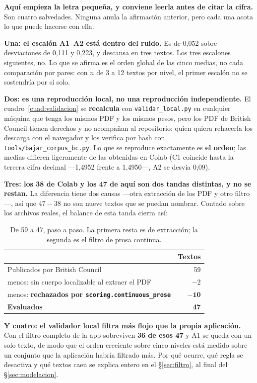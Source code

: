 \documentclass[11pt,a4paper]{article}
\newcommand{\cod}[1]{\texttt{\small #1}}
\begin{document}
\textbf{Aquí empieza la letra pequeña, y conviene leerla antes de citar la cifra.} Son
cuatro salvedades. Ninguna anula la afirmación anterior, pero cada una acota lo que puede
hacerse con ella.

\textbf{Una: el escalón A1--A2 está dentro del ruido.} Es de 0,052 sobre desviaciones de
0,111 y 0,223, y descansa en tres textos. Los tres escalones siguientes, no. Lo que se
afirma es el orden global de las cinco medias, no cada comparación por pares: con $n$ de 3
a 12 textos por nivel, el primer escalón no se sostendría por sí solo.

\textbf{Dos: es una reproducción local, no una reproducción independiente.} El
cuadro~\ref{cuad:validacion} se \textbf{recalcula} con \cod{validar\_local.py} en
cualquier máquina que tenga los mismos PDF y los mismos pesos, pero los PDF de British
Council tienen derechos y no acompañan al repositorio: quien quiera rehacerla los descarga
con el navegador y los verifica por hash con \cod{tools/\allowbreak bajar\_corpus\_bc.py}. Lo que se reproduce exactamente es \textbf{el orden};
las medias difieren ligeramente de las obtenidas en Colab (C1 coincide hasta la tercera
cifra decimal —1,4952 frente a 1,4950—, A2 se desvía 0,09).

\textbf{Tres: los 38 de Colab y los 47 de aquí son dos tandas distintas, y no se restan.}
La diferencia tiene dos causas —otra extracción de los PDF y otro filtro—, así que
$47-38$ no son nueve textos que se puedan nombrar. Contado sobre los archivos reales, el
balance de esta tanda cierra así:

\begin{table}[htbp]
\centering\small
\begin{tabular}{@{}l r@{}}
\toprule
 & \textbf{Textos} \\
\midrule
Publicados por British Council & 59 \\
menos: sin cuerpo localizable al extraer el PDF & $-2$ \\
menos: \textbf{rechazados por \cod{scoring.continuous\_prose}} & $\mathbf{-10}$ \\
\midrule
\textbf{Evaluados} & \textbf{47} \\
\bottomrule
\end{tabular}
\caption{De 59 a 47, paso a paso. La primera resta es de extracción; la segunda
es el filtro de prosa continua.}
\label{cuad:balance}
\end{table}

\textbf{Y cuatro: el validador local filtra más flojo que la propia aplicación.} Con el
filtro completo de la app sobreviven \textbf{36 de esos 47} y A1 se queda con un solo
texto, de modo que el orden creciente sobre cinco niveles está medido sobre un conjunto
que la aplicación habría filtrado más. Por qué ocurre, qué regla se desactiva y qué
textos caen se explica entero en el §\ref{sec:filtro}, al final del
§\ref{sec:modelacion}.
\end{document}

